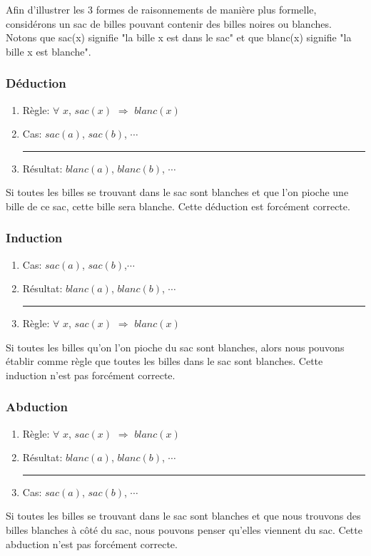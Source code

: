 Afin d'illustrer les 3 formes de raisonnements de manière plus formelle, considérons un sac de billes pouvant contenir des billes noires ou blanches. Notons que sac(x) signifie "la bille x est dans le sac" et que blanc(x) signifie "la bille x est blanche". \\

\subsubsection{Déduction}

\begin{enumerate}
  \item Règle: $\forall$ $x$, $sac(x)$ $\Rightarrow$ $blanc(x)$
  \item Cas: $sac(a)$, $sac(b)$, $\cdots$\\
  \rule{5.5cm}{.1pt} 
  \item Résultat: $blanc(a)$, $blanc(b)$, $\cdots$
\end{enumerate}

Si toutes les billes se trouvant dans le sac sont blanches et que l'on pioche une bille de ce sac, cette bille sera blanche. Cette déduction est forcément correcte.

\subsubsection{Induction}

\begin{enumerate}
  \item Cas: $sac(a)$, $sac(b)$,$\cdots$
  \item Résultat: $blanc(a)$, $blanc(b)$, $\cdots$\\
  \rule{5.5cm}{.1pt}	
  \item Règle: $\forall$ $x$, $sac(x)$ $\Rightarrow$ $blanc(x)$
\end{enumerate}

Si toutes les billes qu'on l'on pioche du sac sont blanches, alors nous pouvons établir comme règle que toutes les billes dans le sac sont blanches. Cette induction n'est pas forcément correcte.

\subsubsection{Abduction}

\begin{enumerate}
  \item Règle: $\forall$ $x$, $sac(x)$ $\Rightarrow$ $blanc(x)$
  \item Résultat: $blanc(a)$, $blanc(b)$, $\cdots$\\
  \rule{5.5cm}{.1pt}
  \item Cas: $sac(a)$, $sac(b)$, $\cdots$
\end{enumerate}

Si toutes les billes se trouvant dans le sac sont blanches et que nous trouvons des billes blanches à côté du sac, nous pouvons penser qu'elles viennent du sac. Cette abduction n'est pas forcément correcte.
